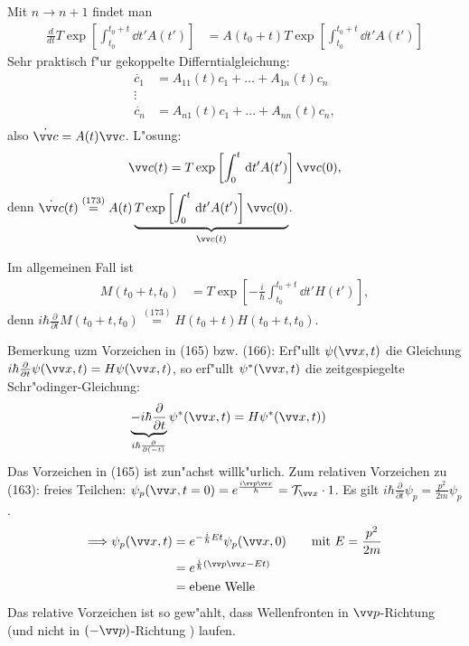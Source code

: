 \documentclass[a4paper]{scrartcl}
\begin{document}
{Mit $n \rightarrow n +1$ findet man
\begin{align}
\frac d {dt} T \exp \left[ \int_{t_0}^{t_0+t} \dd t' A(t') \right] & = A(t_0 + t) T \exp \left[ \int_{t_0}^{t_0+t} \dd t' A(t') \right]
\end{align}
Sehr praktisch f"ur gekoppelte Differntialgleichung:
\begin{align*}
\dot {c_1} & = A_{11}(t) c_1 + \ldots + A_{1n}(t) c_n \\
\vdots \\
\dot {c_n} & = A_{n1}(t) c_1 + \ldots + A_{nn}(t) c_n, \\
\end{align*}
also $\dot{ \vv c} = A(t) \vv c$. L"osung:
\begin{align}
\vv c(t) = T \exp \left[ \int_{0}^t \dd t' A(t') \right] \vv c(0),
\end{align}
denn $\dot{ \vv c}(t) \stackrel{(173)}= A(t) \underbrace{ T \exp \left[ \int_0^t \dd t' A(t') \right] \vv c(0) }_{\vv c(t)}$.

Im allgemeinen Fall ist
\begin{align}
M(t_0 + t, t_0) &= T \exp \left[ - \frac i \hbar \int_{t_0}^{t_0+t} \dd t' H(t') \right],
\end{align}
denn $i \hbar \frac \partial {\partial t} M(t_0+ t, t_0) \stackrel{(173)}=  H(t_0+t) H(t_0+t, t_0)$. 

Bemerkung uzm Vorzeichen in (165) bzw. (166): Erf"ullt $\psi(\vv x, t)$ die Gleichung $i \hbar \frac \partial {\partial t} \psi( \vv x, t) = H \psi (\vv x, t)$, so erf"ullt $\psi^*(\vv x, t)$ die zeitgespiegelte Schr"odinger-Gleichung:
\begin{align}
\underbrace{ - i \hbar \frac \partial {\partial t}}_{i \hbar \frac \partial {\partial (-t)}} \psi^*(\vv x, t) & = H \psi^*(\vv x, t))
\end{align}
Das Vorzeichen in (165) ist zun"achst willk"urlich. Zum relativen Vorzeichen zu (163): freies Teilchen: $\psi_p(\vv x, t=0) = e^{\frac{i \vv p \vv x}{\hbar}} = \mathcal T_{\vv x} \cdot 1$. Es gilt $i \hbar \frac \partial {\partial t} \psi_p = \frac{p^2}{2m} \psi_p$.
\begin{align}
\begin{split}
\Longrightarrow \psi_p(\vv x, t) & = e^{-\frac i \hbar E t } \psi_p(\vv x, 0) \quad \quad \mathrm{mit \ }E = \frac{p^2}{2m}\\
& = e^{\frac i \hbar ( \vv p \vv x - Et)} \\
& = \mathrm{ebene \ Welle}
\end{split}
\end{align}
Das relative Vorzeichen ist so gew"ahlt, dass Wellenfronten in $\vv p$-Richtung (und nicht in $(-\vv p)$-Richtung ) laufen.
}
\end{document}
